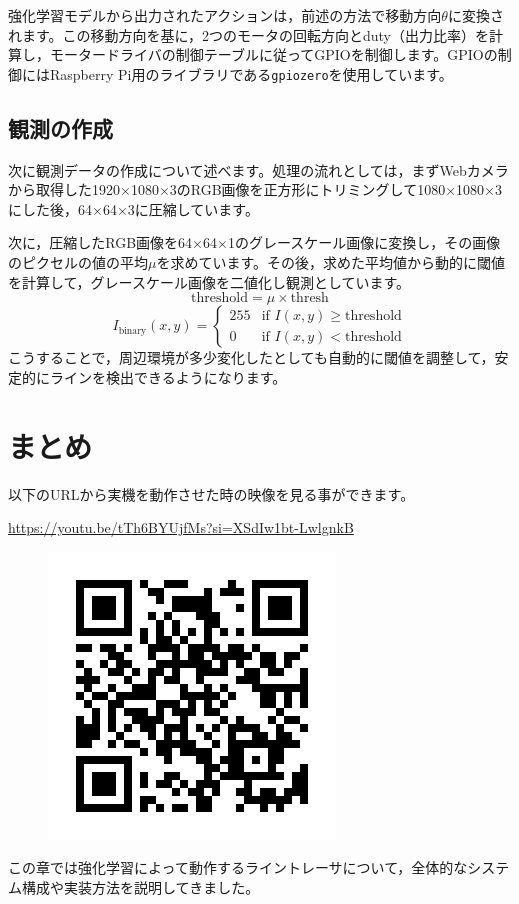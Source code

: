 強化学習モデルから出力されたアクションは，前述の方法で移動方向$\theta$に変換されます。この移動方向を基に，2つのモータの回転方向とduty（出力比率）を計算し，モータードライバの制御テーブルに従ってGPIOを制御します。GPIOの制御にはRaspberry Pi用のライブラリである\texttt{gpiozero}を使用しています。

\subsection{観測の作成}
次に観測データの作成について述べます。処理の流れとしては，まずWebカメラから取得した1920×1080×3のRGB画像を正方形にトリミングして1080×1080×3にした後，64×64×3に圧縮しています。

次に，圧縮したRGB画像を64×64×1のグレースケール画像に変換し，その画像のピクセルの値の平均$\mu$を求めています。その後，求めた平均値から動的に閾値を計算して，グレースケール画像を二値化し観測としています。
\[
\text{threshold} = \mu \times \text{thresh}
\]
\[
I_{\text{binary}}(x, y) =
\begin{cases}
255 & \text{if } I(x, y) \geq \text{threshold} \\
0 & \text{if } I(x, y) < \text{threshold}
\end{cases}
\]
こうすることで，周辺環境が多少変化したとしても自動的に閾値を調整して，安定的にラインを検出できるようになります。

\section{まとめ}
以下のURLから実機を動作させた時の映像を見る事ができます。

\url{https://youtu.be/tTh6BYUjfMs?si=XSdIw1bt-LwlgnkB}
\begin{figure}[h]
  \includegraphics[width=0.4\hsize]{line-tracer/fig/QR.png}
\end{figure}

この章では強化学習によって動作するライントレーサについて，全体的なシステム構成や実装方法を説明してきました。

